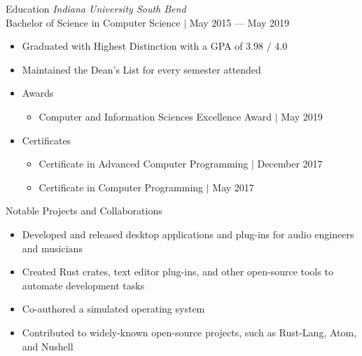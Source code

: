 \documentclass{Joseph_T_Lyons_Resume}
\newenvironment{tightlySpacedList}
{ \begin{itemize}
    \setlength{\itemsep}{0pt}
    \setlength{\parskip}{0pt}
    \setlength{\parsep}{0pt}     }
{ \end{itemize}                  }
\begin{document}
\begin{rSection}{Education}
\textit{Indiana University South Bend}
\\Bachelor of Science in Computer Science $\mid$ May 2015 --- May 2019
\begin{tightlySpacedList}
    \item Graduated with Highest Distinction with a GPA of 3.98 / 4.0
    \item Maintained the Dean's List for every semester attended
    \item Awards
    \begin{tightlySpacedList}
        \item Computer and Information Sciences Excellence Award $\mid$ May 2019
    \end{tightlySpacedList}
    \item Certificates
    \begin{tightlySpacedList}
        \item Certificate in Advanced Computer Programming $\mid$ December 2017
        \item Certificate in Computer Programming $\mid$ May 2017
    \end{tightlySpacedList}
\end{tightlySpacedList}
\end{rSection}

\newpage

\begin{rSection}{Notable Projects and Collaborations}
\begin{tightlySpacedList}
    \item Developed and released desktop applications and plug-ins for audio
     engineers and musicians
    \item Created Rust crates, text editor plug-ins, and other open-source tools
     to automate development tasks
    \item Co-authored a simulated operating system
    \item Contributed to widely-known open-source projects, such as Rust-Lang,
     Atom, and Nushell
\end{tightlySpacedList}
\end{rSection}
\end{document}
